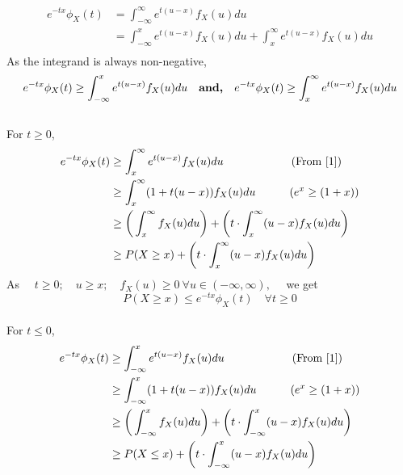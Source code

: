 \documentclass[11pt, fleqn]{article}
\begin{document}
\begin{equation*}
    \begin{split} 
        e^{-tx} \phi_X(t) &= \int_{-\infty}^{\infty} e^{t(u-x)} f_X(u) du \\
            &= \int_{-\infty}^{x} e^{t(u-x)} f_X(u) du + \int_{x}^{\infty} e^{t(u-x)} f_X(u) du \\
    \end{split}
\end{equation*}
As the integrand is always non-negative,
\begin{equation}
    \label{1}
    \begin{split}
        e^{-tx} \phi_X(t) &\ge \int_{-\infty}^{x} e^{t(u-x)} f_X(u) du
        \hspace{1em}\text{\textbf{and,}}\hspace{1em}
        e^{-tx} \phi_X(t) \ge \int_{x}^{\infty} e^{t(u-x)} f_X(u) du \\
    \end{split}
\end{equation}
\\
For $t \ge 0$,
\begin{equation}
    \begin{split}
        e^{-tx} \phi_X(t) &\ge \int_{x}^{\infty} e^{t(u-x)} f_X(u) du \hspace{6em} (\text{From \ref{1}}) \\
            &\ge \int_{x}^{\infty} (1 + t(u-x)) f_X(u) du \hspace{3em} (e^x \ge (1 + x)) \\
            &\ge \bigg ( \int_{x}^{\infty} f_X(u) du \bigg ) + \bigg(t \cdot \int_{x}^{\infty} (u-x) f_X(u) du\bigg) \\
            &\ge P(X \ge x) + \bigg ( t \cdot \int_{x}^{\infty} (u-x) f_X(u) du \bigg )
    \end{split}
\end{equation}
As $\quad t \ge 0;\quad u \ge x; \quad f_X(u) \ge 0 \  \forall u\in(-\infty, \infty), \quad$ we get
\begin{equation}
    \label{3}
    \boxed{P(X \ge x) \le e^{-tx} \phi_X(t) \quad \forall t \ge 0}
\end{equation}
\\
For $t \le 0$,
\begin{equation}
    \begin{split}
        e^{-tx} \phi_X(t) &\ge \int_{-\infty}^{x} e^{t(u-x)} f_X(u) du \hspace{6em} (\text{From \ref{1}}) \\
            &\ge \int_{-\infty}^{x} (1 + t(u-x)) f_X(u) du \hspace{3em} (e^x \ge (1 + x)) \\
            &\ge \bigg(\int_{-\infty}^{x} f_X(u) du\bigg) + \bigg(t \cdot \int_{-\infty}^{x} (u-x) f_X(u) du\bigg) \\
            &\ge P(X \le x) + \bigg(t \cdot \int_{-\infty}^{x} (u-x) f_X(u) du\bigg)
    \end{split}
\end{equation}
\end{document}
